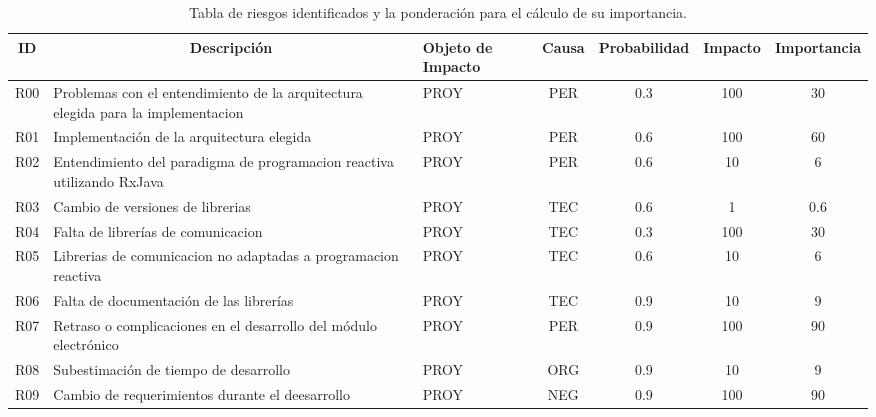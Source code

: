 \begin{table}[ht]
		\begin{tabular}{|c|m{3cm}|m{5em}|c|c|c|c|}
			\hline
			\textbf{ID} & \multicolumn{1}{c|}{\textbf{Descripción}}                                        & \textbf{Objeto de Impacto} & \textbf{Causa} & \textbf{Probabilidad} & \textbf{Impacto} & \textbf{Importancia} \\ \hline
			R00         & Problemas con el entendimiento de la arquitectura elegida para la implementacion & PROY                       & PER            & 0.3                   & 100              & 30                   \\ \hline
			R01         & Implementación de la arquitectura elegida                                        & PROY                       & PER            & 0.6                   & 100              & 60                   \\ \hline
			R02         & Entendimiento del paradigma de programacion reactiva utilizando RxJava           & PROY                       & PER            & 0.6                   & 10               & 6                    \\ \hline
			R03         & Cambio de versiones de librerias                                                 & PROY                       & TEC            & 0.6                   & 1                & 0.6                  \\ \hline
			R04         & Falta de librerías de comunicacion                                               & PROY                       & TEC            & 0.3                   & 100              & 30                   \\ \hline
			R05         & Librerias de comunicacion no adaptadas a programacion reactiva                   & PROY                       & TEC            & 0.6                   & 10               & 6                    \\ \hline
			R06         & Falta de documentación de las librerías                                          & PROY                       & TEC            & 0.9                   & 10               & 9                    \\ \hline
			R07         & Retraso o complicaciones en el desarrollo del módulo electrónico                 & PROY                       & PER            & 0.9                   & 100              & 90                   \\ \hline
			R08         & Subestimación de tiempo de desarrollo                                            & PROY                       & ORG            & 0.9                   & 10               & 9                    \\ \hline
			R09         & Cambio de requerimientos durante el deesarrollo                                  & PROY                       & NEG            & 0.9                   & 100              & 90                   \\ \hline
		\end{tabular}
	\caption[Riesgos Identificados]{Tabla de riesgos identificados y la ponderación para el cálculo de su importancia.}
	\label{table:riegos_identificados}
\end{table}

